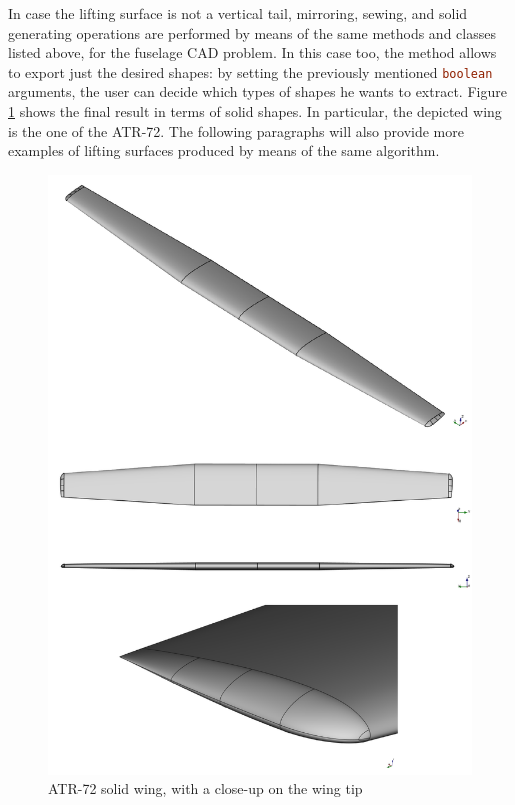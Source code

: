 \bigskip
\noindent
In case the lifting surface is not a vertical tail, mirroring, sewing, and solid generating operations are performed by means of the same methods and classes listed above, for the fuselage \gls{CAD} problem. In this case too, the method allows to export just the desired shapes: by setting the previously mentioned \lstinline[language=Java]!boolean! arguments, the user can decide which types of shapes he wants to extract. Figure \ref{fig:WingSolid} shows the final result in terms of solid shapes. In particular, the depicted wing is the one of the ATR-72. The following paragraphs will also provide more examples of lifting surfaces produced by means of the same algorithm.
% 
\begin{figure}[H]
\centering
\includegraphics[scale=0.68]{Immagini/Capitolo3/wing_2}
\caption{ATR-72 solid wing, with a close-up on the wing tip}
\label{fig:WingSolid}
\end{figure}
%  

